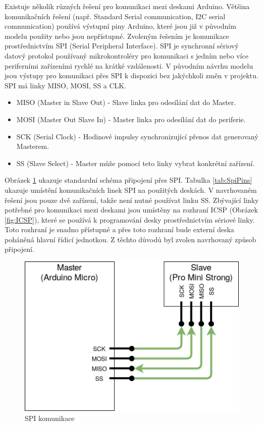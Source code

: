\documentclass[thesis=B,czech]{FITthesis}[2012/06/26]
\begin{document}
Existuje několik různých řešení pro komunikaci mezi deskami Arduino. Většina komunikačních řešení (např. Standard Serial communication, I2C serial communication) používá výstupní piny Arduino, které jsou již v původním modelu použity nebo jsou nepřístupné. Zvoleným řešením je komunikace prostřednictvím SPI (Serial Peripheral Interface). SPI je synchronní sériový datový protokol používaný mikrokontroléry pro komunikaci s jedním nebo více periferními zařízeními rychlé na krátké vzdálenosti. V původním návrhu modelu jsou výstupy pro komunikaci přes SPI k dispozici bez jakýchkoli změn v projektu. SPI má linky MISO, MOSI, SS a CLK\cite{spiAtm}.

 \begin{itemize}
  \item MISO (Master in Slave Out) - Slave linka pro odesílání dat do Master.
  \item MOSI (Master Out Slave In) - Master linka pro odesílání dat do periferie.
  \item SCK (Serial Clock) - Hodinové impulsy synchronizující přenos dat generovaný Masterem.
  \item SS (Slave Select) - Master může pomocí teto linky vybrat konkrétní zařízení.
 \end{itemize}

 
Obrázek \ref{fig:SPIClassic} ukazuje standardní schéma připojení přes SPI. Tabulka \ref{tab:SpiPins} ukazuje umístění komunikačních linek SPI na použitých deskách. V navrhovaném řešení jsou pouze dvě zařízení, takže není nutné používat linku SS. Zbývající linky potřebné pro komunikaci mezi deskami jsou umístěny na rozhraní ICSP (Obrázek \ref{fig:ICSP}), které se používá k programování desky prostřednictvím sériové linky. Toto rozhraní je snadno přístupné a přes toto rozhraní bude externí deska poháněná hlavní řídicí jednotkou. Z těchto důvodů byl zvolen navrhovaný způsob připojení.

 
 \begin{figure}[H]
\centering
\includegraphics[scale=0.3]{./image/SPIClassic.png}
\caption{SPI komunikace}
\label{fig:SPIClassic}
\end{figure}
 
\end{document}
